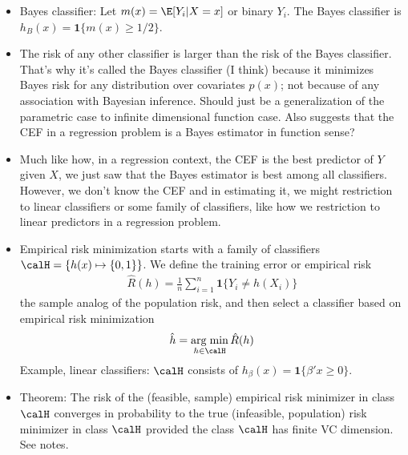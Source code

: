 \documentclass[12pt]{article}
\theoremstyle{plain}
\theoremstyle{definition}
\theoremstyle{remark}
\DeclareMathOperator*{\argmin}{arg\;min}
\newcommand{\sumin}{\sum^n_{i=1}}
\begin{document}
\begin{itemize}
  \item
    Bayes classifier:
    Let $m(x)=\E[Y_i|X=x]$ or binary $Y_i$.
    The Bayes classifier is $h_B(x)=\mathbf{1}\{m(x)\geq 1/2\}$.
  \item
    The risk of any other classifier is larger than the risk of the
    Bayes classifier.
    That's why it's called the Bayes classifier (I think) because it
    minimizes Bayes risk for any distribution over covariates $p(x)$;
    not because of any association with Bayesian inference.
    Should just be a generalization of the parametric case to infinite
    dimensional function case.
    Also suggests that the CEF in a regression problem is a Bayes
    estimator in function sense?
  \item
    Much like how, in a regression context, the CEF is the best
    predictor of $Y$ given $X$, we just saw that the Bayes estimator is
    best among all classifiers.
    However, we don't know the CEF and in estimating it, we might
    restriction to linear classifiers or some family of classifiers,
    like how we restriction to linear predictors in a regression
    problem.

  \item Empirical risk minimization starts with a family of classifiers
    $\calH=\{h(x)\mapsto \{0,1\}\}$.
    We define the training error or empirical risk
    \begin{align*}
      \hat{R}(h)
      =
      \frac{1}{n}
      \sumin
      \mathbf{1}\{Y_i\neq h(X_i)\}
    \end{align*}
    the sample analog of the population risk, and then select a
    classifier based on empirical risk minimization
    \begin{align*}
      \hat{h}
      =
      \argmin_{h\in\calH}
      \hat{R}(h)
    \end{align*}
    Example, linear classifiers:
    $\calH$ consists of
    $h_\beta(x)=\mathbf{1}\{\beta'x\geq 0\}$.

  \item
    Theorem:
    The risk of the (feasible, sample) empirical risk minimizer
    in class $\calH$ converges in probability to the true (infeasible,
    population) risk minimizer in class $\calH$ provided the
    class $\calH$ has finite VC dimension.
    See notes.


\end{itemize}
\end{document}
